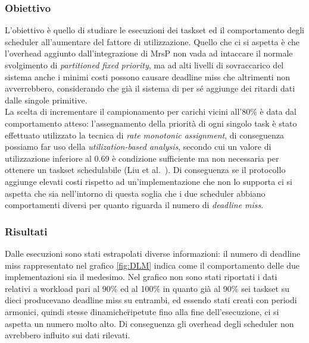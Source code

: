 \subsubsection{Obiettivo}
\label{sec:confronto_norisorsa_ob}

\noindent L'obiettivo è quello di studiare le esecuzioni dei taskset ed il comportamento degli scheduler all'aumentare del fattore di utilizzazione. Quello che ci si aspetta è che l'overhead aggiunto dall'integrazione di MrsP non vada ad intaccare il normale svolgimento di \textit{partitioned fixed priority}, ma ad alti livelli di sovraccarico del sistema anche i minimi costi possono causare deadline miss che altrimenti non avverrebbero, considerando che già il sistema di per sé aggiunge dei ritardi dati dalle singole primitive.\\

\noindent La scelta di incrementare il campionamento per carichi vicini all'80\% è data dal comportamento atteso: l'assegnamento della priorità di ogni singolo task è stato effettuato utilizzato la tecnica di \textit{rate monotonic assignment}, di conseguenza possiamo far uso della \textit{utilization-based analysis}, secondo cui un valore di utilizzazione inferiore al 0.69 è condizione sufficiente ma non necessaria per ottenere un taskset schedulabile (Liu et al.~\cite{Liu:1973:SAM:321738.321743}). Di conseguenza se il protocollo aggiunge elevati costi rispetto ad un'implementazione che non lo supporta ci si aspetta che sia nell'intorno di questa soglia che i due scheduler abbiano comportamenti diversi per quanto riguarda il numero di \textit{deadline miss}.\\

\subsubsection{Risultati}
\label{sec:confronto_norisorsa_ris}

\noindent Dalle esecuzioni sono stati estrapolati diverse informazioni: il numero di deadline miss rappresentato nel grafico \ref{fig:DLM} indica come il comportamento delle due implementazioni sia il medesimo. Nel grafico non sono stati riportati i dati relativi a workload pari al 90\% ed al 100\% in quanto già al 90\% sei taskset su dieci producevano deadline miss su entrambi, ed essendo stati creati con periodi armonici, quindi stesse \"dinamiche\" ripetute fino alla fine dell'esecuzione, ci si aspetta un numero molto alto. Di conseguenza gli overhead degli scheduler non avrebbero influito sui dati rilevati.\\

